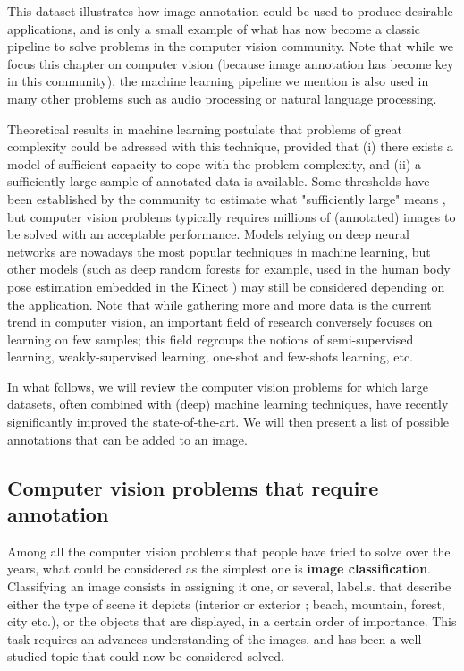 This dataset illustrates how image annotation could be used to produce desirable applications, and is only a small example of what has now become a classic pipeline to solve problems in the computer vision community. Note that while we focus this chapter on computer vision (because image annotation has become key in this community), the machine learning pipeline we mention is also used in many other problems such as audio processing or natural language processing. 

Theoretical results in machine learning postulate that problems of great complexity could be adressed with this technique, provided that (i) there exists a model of sufficient capacity to cope with the problem complexity, and (ii) a sufficiently large sample of annotated data is available. Some thresholds have been established by the community to estimate what "sufficiently large" means \cite{blabla}, but computer vision problems typically requires millions of (annotated) images to be solved with an acceptable performance. Models relying on deep neural networks are nowadays the most popular techniques in machine learning, but other models (such as deep random forests for example, used in the human body pose estimation embedded in the Kinect \cite{blabla}) may still be considered depending on the application. Note that while gathering more and more data is the current trend in computer vision, an important field of research conversely focuses on learning on few samples; this field regroups the notions of semi-supervised learning, weakly-supervised learning, one-shot and few-shots learning, etc. 

In what follows, we will review the computer vision problems for which large datasets, often combined with (deep) machine learning techniques, have recently significantly improved the state-of-the-art. We will then present a list of possible annotations that can be added to an image. 

\subsection{Computer vision problems that require annotation}
  
Among all the computer vision problems that people have tried to solve over the years, what could be considered as the simplest one is \textbf{image classification}. Classifying an image consists in assigning it one, or several, label.s. that describe either the type of scene it depicts (interior or exterior ; beach, mountain, forest, city etc.), or the objects that are displayed, in a certain order of importance. This task requires an advances understanding of the images, and has been a well-studied topic that could now be considered solved. 


